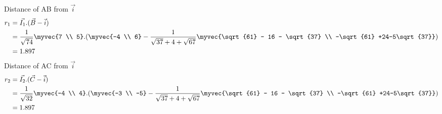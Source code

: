 \documentclass[journal,12pt,twocolumn]{IEEEtran}
\theoremstyle{remark}
\begin{document}
Distance of AB from $\vec{i}$
\begin{align}
r_1 &= \vec{I_1} . (\vec{B}-\vec{i})\\
&= \frac{1}{\sqrt{74}}\myvec{7 \\ 5} . (\myvec{-4 \\ 6} - \frac{1}{\sqrt{37} + 4 + \sqrt{67}}\myvec{\sqrt{61} - 16 - \sqrt{37} \\ -\sqrt{61} +24-5\sqrt{37}} )\\
&= 1.897
\end{align}
Distance of AC from $\vec{i}$
\begin{align}
r_2 &= \vec{I_2} . (\vec{C}-\vec{i})\\
&= \frac{1}{\sqrt{32}}\myvec{-4 \\ 4} . (\myvec{-3 \\ -5} - \frac{1}{\sqrt{37} + 4 + \sqrt{67}}\myvec{\sqrt{61} - 16 - \sqrt{37} \\ -\sqrt{61} +24-5\sqrt{37}} )\\
&= 1.897
\end{align}
\end{document}
